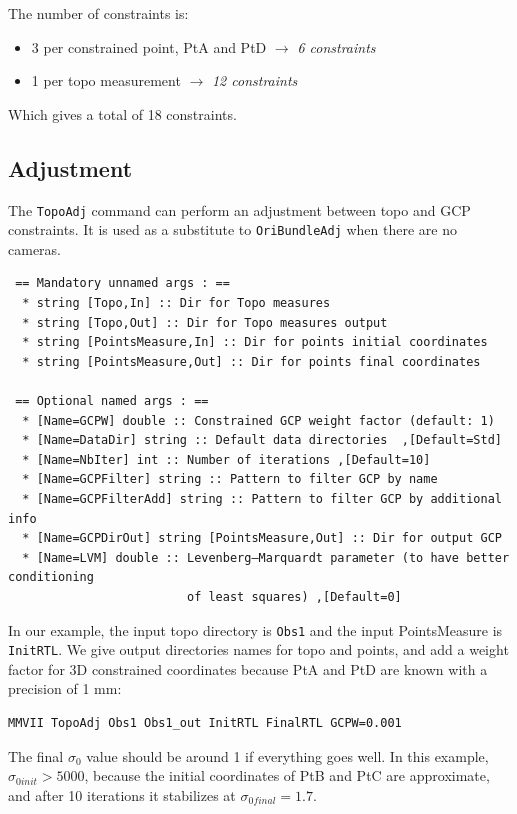 The number of constraints is:
\begin{itemize}
   \item 3 per constrained point, PtA and PtD  $\rightarrow$ \textit{6 constraints}
   \item 1 per topo measurement $\rightarrow$ \textit{12 constraints}
\end{itemize}

Which gives a total of 18 constraints.


\subsection{Adjustment}
\label{subsec:TopoAdj}
The \texttt{TopoAdj} command can perform an adjustment between topo and GCP constraints.
It is used as a substitute to \texttt{OriBundleAdj} when there are no cameras.

\begin{verbatim}
 == Mandatory unnamed args : ==
  * string [Topo,In] :: Dir for Topo measures
  * string [Topo,Out] :: Dir for Topo measures output
  * string [PointsMeasure,In] :: Dir for points initial coordinates
  * string [PointsMeasure,Out] :: Dir for points final coordinates

 == Optional named args : ==
  * [Name=GCPW] double :: Constrained GCP weight factor (default: 1)
  * [Name=DataDir] string :: Default data directories  ,[Default=Std]
  * [Name=NbIter] int :: Number of iterations ,[Default=10]
  * [Name=GCPFilter] string :: Pattern to filter GCP by name
  * [Name=GCPFilterAdd] string :: Pattern to filter GCP by additional info
  * [Name=GCPDirOut] string [PointsMeasure,Out] :: Dir for output GCP
  * [Name=LVM] double :: Levenberg–Marquardt parameter (to have better conditioning
                         of least squares) ,[Default=0]
\end{verbatim}

In our example, the input topo directory is \texttt{Obs1} and the input PointsMeasure is \texttt{InitRTL}.
We give output directories names for topo and points, and add a weight factor for 3D constrained coordinates
because PtA and PtD are known with a precision of 1 mm:
\begin{lstlisting}
MMVII TopoAdj Obs1 Obs1_out InitRTL FinalRTL GCPW=0.001
\end{lstlisting}

The final $\sigma_0$ value should be around 1 if everything goes well.
In this example, $\sigma_{0 init} > 5000$, because the initial coordinates of PtB and PtC are approximate,
and after 10 iterations it stabilizes at $\sigma_{0 final} = 1.7$.
\\


